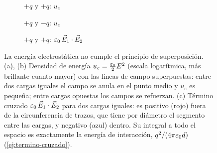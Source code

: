 \begin{figure}[t]
\centering
{}
\begin{subfigure}[b]{0.325\textwidth}\centering
{}
\caption{$+q$ y $+q$: $u_e$}
\end{subfigure}\hfill
\begin{subfigure}[b]{0.325\textwidth}\centering
{}
\caption{$+q$ y $-q$: $u_e$}
\end{subfigure}\hfill
\begin{subfigure}[b]{0.325\textwidth}\centering
{}
\caption{$+q$ y $+q$: $\varepsilon_0\,\vec E_1\cdot\vec E_2$}
\end{subfigure}
\caption{La energía electrostática no cumple el principio de superposición. (a), (b) Densidad de energía
$u_e=\frac{\varepsilon_0}{2}E^2$ (escala logarítmica, más brillante cuanto mayor) con las líneas de campo superpuestas: entre dos cargas
iguales el campo se anula en el punto medio y $u_e$ es pequeña; entre cargas opuestas los campos se refuerzan.
(c) Término cruzado $\varepsilon_0\,\vec E_1\cdot\vec E_2$ para dos cargas iguales: es positivo (rojo) fuera de la circunferencia de
trazos, que tiene por diámetro el segmento entre las cargas, y negativo (azul) dentro. Su integral a todo el espacio
es exactamente la energía de interacción, $q^2/(4\pi\varepsilon_0 d)$ (\cref{ej:termino-cruzado}).}
\label{fig:superposicion}
\end{figure}

